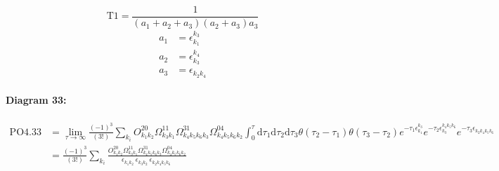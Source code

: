 \documentclass[10pt,a4paper]{article}
\begin{document}
\begin{equation}
\text{T}1 = \frac{1}{(a_1+ a_2+ a_3)(a_2+ a_3)a_3}\end{equation}
\begin{align*}
a_1 &= \epsilon^{k_{3}}_{k_{1}}\\
a_2 &= \epsilon^{k_{4}}_{k_{3}}\\
a_3 &= \epsilon^{}_{k_{2}k_{4}}
\end{align*}
\paragraph{Diagram 33:}
\begin{align}
\text{PO}4.33
&= \lim\limits_{\tau \to \infty}\frac{(-1)^3 }{(3!)}\sum_{k_i}O^{20}_{k_{1}k_{2}} \Omega^{11}_{k_{3}k_{1}} \Omega^{31}_{k_{4}k_{5}k_{6}k_{3}} \Omega^{04}_{k_{4}k_{5}k_{6}k_{2}} \int_{0}^{\tau}\mathrm{d}\tau_1\mathrm{d}\tau_2\mathrm{d}\tau_3\theta(\tau_2-\tau_1) \theta(\tau_3-\tau_2) e^{-\tau_1 \epsilon^{k_{3}}_{k_{1}}}e^{-\tau_2 \epsilon^{k_{4}k_{5}k_{6}}_{k_{3}}}e^{-\tau_3 \epsilon^{}_{k_{2}k_{4}k_{5}k_{6}}}
 \nonumber \\
&= \frac{(-1)^3 }{(3!)}\sum_{k_i}\frac{O^{20}_{k_{1}k_{2}} \Omega^{11}_{k_{3}k_{1}} \Omega^{31}_{k_{4}k_{5}k_{6}k_{3}} \Omega^{04}_{k_{4}k_{5}k_{6}k_{2}} }{\epsilon^{}_{k_{1}k_{2}}\ \epsilon^{}_{k_{3}k_{2}}\ \epsilon^{}_{k_{2}k_{4}k_{5}k_{6}}\ } 
\end{align}
\end{document}

